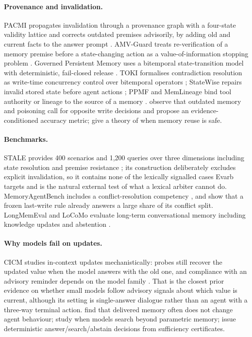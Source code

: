 \paragraph{Provenance and invalidation.} PACMI propagates invalidation through a provenance graph with a four-state
validity lattice and corrects outdated premises advisorily, by adding old and current facts to the answer prompt
\citep{wang2026pacmi}. AMV-Guard treats re-verification of a memory premise before a state-changing action as a
value-of-information stopping problem \citep{wang2026amvguard}. Governed Persistent Memory uses a bitemporal
state-transition model with deterministic, fail-closed release \citep{xu2026gpm}. TOKI formalises contradiction
resolution as write-time concurrency control over bitemporal operators \citep{wang2026toki}; StateWise repairs
invalid stored state before agent actions \citep{peng2026statewise}; PPMF and MemLineage bind tool authority or
lineage to the source of a memory \citep{xu2026ppmf,ouyang2026memlineage}. \citet{zhao2026accept} observe that
outdated memory and poisoning call for opposite write decisions and propose an evidence-conditioned accuracy
metric; \citet{zhou2026manysteps} give a theory of when memory reuse is safe.

\paragraph{Benchmarks.} STALE provides 400 scenarios and 1{,}200 queries over three dimensions including state
resolution and premise resistance \citep{chao2026stale}; its construction deliberately excludes explicit
invalidation, so it contains none of the lexically signalled cases Evarb targets and is the natural external test
of what a lexical arbiter cannot do. MemoryAgentBench includes a conflict-resolution competency
\citep{hu2025memoryagentbench}, and \citet{pakhomov2026bookkeeping} show that a frozen last-write rule already
answers a large share of its conflict split. LongMemEval and LoCoMo evaluate long-term conversational memory
including knowledge updates and abstention \citep{wu2024longmemeval,maharana2024locomo}.

\paragraph{Why models fail on updates.} CICM studies in-context updates mechanistically: probes still recover the
updated value when the model answers with the old one, and compliance with an advisory reminder depends on the
model family \citep{guo2026cicm}. That is the closest prior evidence on whether small models follow advisory signals
about which value is current, although its setting is single-answer dialogue rather than an agent with a three-way
terminal action. \citet{xu2026delivered} find that delivered memory often does not change agent behaviour;
\citet{pathirage2026confident} study when models search beyond parametric memory; \citet{zhang2026horn} issue
deterministic answer/search/abstain decisions from sufficiency certificates.

